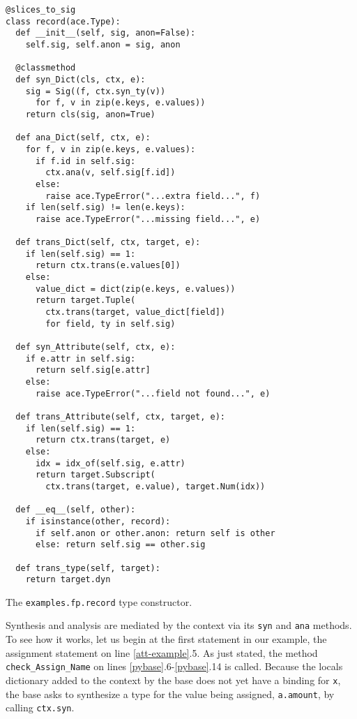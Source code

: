 {\begin{codelisting}
\begin{lstlisting}
@slices_to_sig
class record(ace.Type):
  def __init__(self, sig, anon=False):
    self.sig, self.anon = sig, anon
    
  @classmethod 
  def syn_Dict(cls, ctx, e):
    sig = Sig((f, ctx.syn_ty(v)) 
      for f, v in zip(e.keys, e.values))
    return cls(sig, anon=True)
    
  def ana_Dict(self, ctx, e):
    for f, v in zip(e.keys, e.values):
      if f.id in self.sig:
        ctx.ana(v, self.sig[f.id])
      else:
        raise ace.TypeError("...extra field...", f)
    if len(self.sig) != len(e.keys):
      raise ace.TypeError("...missing field...", e)
      
  def trans_Dict(self, ctx, target, e):
    if len(self.sig) == 1:
      return ctx.trans(e.values[0])
    else:
      value_dict = dict(zip(e.keys, e.values))
	  return target.Tuple(
	    ctx.trans(target, value_dict[field])
	    for field, ty in self.sig)

  def syn_Attribute(self, ctx, e): 
    if e.attr in self.sig: 
      return self.sig[e.attr]
    else:
      raise ace.TypeError("...field not found...", e)
      
  def trans_Attribute(self, ctx, target, e): 
    if len(self.sig) == 1:
      return ctx.trans(target, e)
    else:
      idx = idx_of(self.sig, e.attr)
      return target.Subscript(
        ctx.trans(target, e.value), target.Num(idx))
        
  def __eq__(self, other):
    if isinstance(other, record): 
      if self.anon or other.anon: return self is other
      else: return self.sig == other.sig

  def trans_type(self, target):
    return target.dyn
\end{lstlisting}
%
\caption{The \texttt{examples.fp.record} type constructor.}
\label{record}
\end{codelisting}
 Synthesis and analysis are mediated by the context via its \verb|syn| and \verb|ana| methods. To see how it works, let us begin at the first statement in our example, the assignment statement on line \ref{att-example}.5. As just stated, the method \verb|check_Assign_Name| on lines \ref{pybase}.6-\ref{pybase}.14 is called. Because the locals dictionary added to the context by the base does not yet have a binding for \verb|x|, the base asks to synthesize a type for the value being assigned, \verb|a.amount|, by calling \verb|ctx.syn|.

}
